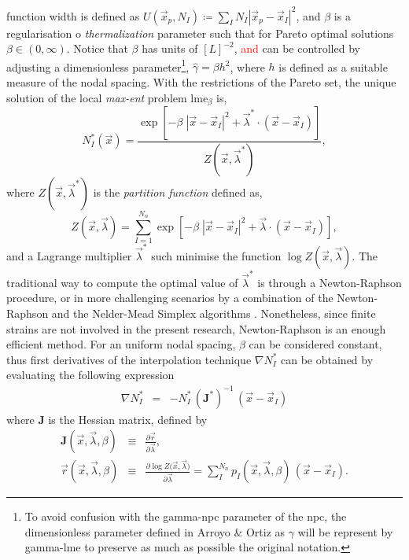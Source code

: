 \documentclass[preprint,12pt,a4paper]{elsarticle}
\newcommand{\tens}[1]{
  \ensuremath{\mathbf{{#1}}}
}
\begin{document}
function width is defined as $U(\vec{x}_p,N_I) \coloneqq
\sum_I N_I |\vec{x}_p - \vec{x}_I |^2$, and $\beta$ is a
regularisation o \textit{thermalization} parameter such that for
Pareto optimal solutions $\beta \in
(0,\infty)$. Notice that $\beta$ has units of $[L]^{-2}$,
\textcolor{red}{and} can be controlled by adjusting a dimensionless
parameter\footnote{To avoid confusion with the \gls{gamma-npc} parameter of
  the \acrshort{npc}, the dimensionless parameter defined in Arroyo \&
  Ortiz \cite{Arroyo2006} as $\gamma$ will be represent by
  \gls{gamma-lme} to preserve as much as possible the original notation.},
$\widehat{\gamma}=\beta h^2$, where $h$ is defined as a
suitable measure of the nodal spacing. With the restrictions of the
Pareto set, the unique solution of the local
\textit{max-ent} problem \acrshort{lme}$_\beta$ is,
 \begin{equation}
  \label{eq:LME-p}
N_I^*(\vec{x})=\frac{\exp\left[ -\beta \; |\vec{x}-\vec{x}_I|^2 +
    \vec{\lambda}^* \cdot (\vec{x}-\vec{x}_I) \right] } {Z(\vec{x},\vec{\lambda}^*)},
\end{equation}
where $Z(\vec{x},\vec{\lambda}^*)$ is the \textit{partition function} defined as,
\begin{equation}
  \label{eq:LME-Z}
Z(\vec{x}, {\vec{\lambda}}) = \sum_{I=1}^{N_n}{ \exp \left[ -\beta \; |\vec{x}-\vec{x}_I|^2 + \vec{\lambda} \cdot (\vec{x}-\vec{x}_I)  \right]},
\end{equation}
and a Lagrange multiplier $\vec{\lambda}^*$ such minimise the function $\log
Z(\vec{x}, \vec{\lambda})$.
The traditional way to compute the optimal value of $\vec{\lambda}^*$
is through a Newton-Raphson procedure, or in more challenging
scenarios by a combination of the Newton-Raphson and the Nelder-Mead
Simplex algorithms \cite{Navas2018a}. Nonetheless, since finite
strains are not involved in the present research, Newton-Raphson is an
enough efficient method. For an uniform nodal spacing, $\beta$ can be
considered constant, thus first derivatives of the interpolation technique $\nabla
N^*_I$ can be obtained 
by evaluating the following expression
\begin{eqnarray}
  \label{eq:LME-gradp} 
\nabla N^*_I &=& -N^*_I \,  (\tens{J}^*)^{-1} \,  (\vec{x} - \vec{x}_I)
\end{eqnarray}
where $\tens{J}$ is the Hessian matrix, defined by
\begin{eqnarray}
  \label{eq:LME-J} 
  \tens{J}(\vec{x}, \vec{\lambda},\beta) &\equiv& \frac{\partial
                                                  \vec{r}}{\partial \vec{\lambda}},\\
  \label{eq:LME-r}
  \vec{r}(\vec{x},\vec{\lambda},\beta) &\equiv& \frac{\partial \log{ Z(   \vec{x},\vec{\lambda}})}{\partial \vec{\lambda}}  = \sum_I^{N_n} p_I(\vec{x},\vec{\lambda},\beta) \, (\vec{x} - \vec{x}_I).
\end{eqnarray}
\end{document}
